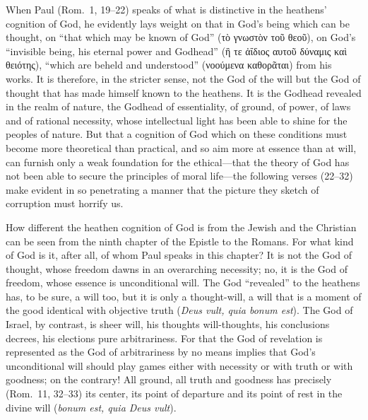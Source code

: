 \documentclass[12pt,a4paper]{article}
\newcommand{\opage}[1]{\marginnote{\footnotesize\textit{[#1]}}}
\begin{document}
When Paul (Rom.\ 1, 19--22) speaks of what is distinctive in the
heathens' cognition of God, he evidently lays weight on that in God's
being which can be thought, on ``that which may be known of God'' (τὸ
γνωστὸν τοῦ θεοῦ), on God's ``invisible being, his eternal power and
Godhead'' (ἣ τε ἀΐδιος αυτοῦ δύναμις καὶ θειότης), ``which are beheld
and understood'' (νοούμενα καθορᾶται)
from his works. It is therefore, in the stricter sense, not the God
of the will but the God of thought that has made himself known to the
heathens. It is the Godhead revealed in the realm of nature, the
Godhead of essentiality, of ground, of power, of laws and of rational
necessity, whose intellectual light has been able to shine for the
peoples of nature. But that a cognition of God which on these
conditions must become more theoretical than practical, and so aim
more at essence than at will, can furnish only a weak foundation for
the ethical---that the theory of God has not been able to secure the
principles of moral life---the following verses (22--32) make evident
in so penetrating a manner that the picture they sketch of corruption
must horrify us.

How different the heathen cognition of God is from the Jewish and the
Christian can be seen from the ninth chapter of the Epistle to the
Romans. For what kind of God is it, after all, of whom Paul speaks in
this chapter? It is not the God of thought, whose freedom dawns in an
overarching necessity; no, it is the God of freedom, whose essence is
unconditional will. The God ``revealed'' to the heathens has, to be
sure, a will too, but it is only a thought-will, a will that is a
moment of the good identical with objective truth (\textit{Deus vult,
quia bonum est}). The God of Israel, by contrast, is sheer will, his
thoughts will-thoughts,
\opage{75}his conclusions decrees, his elections pure arbitrariness.
For that the God of revelation is represented as the God of
arbitrariness by no means implies that God's unconditional will should
play games either with necessity or with truth or with goodness; on
the contrary! All ground, all truth and goodness has precisely
(Rom.\ 11, 32--33) its center, its point of departure and its point of
rest in the divine will (\textit{bonum est, quia Deus vult}).
\end{document}

